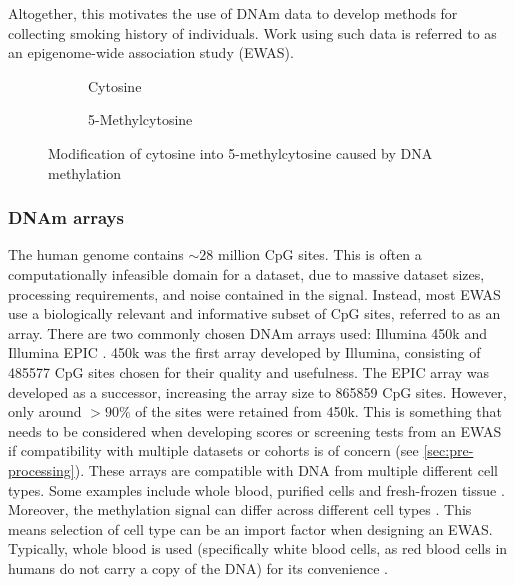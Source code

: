 \documentclass{article} %
\begin{document}
Altogether, this motivates the use of DNAm data to develop methods for collecting smoking history of individuals. Work using such data is referred to as an epigenome-wide association study (EWAS).

\begin{figure}
    \begin{subfigure}{0.49\textwidth}
        \centering
        \hspace*{11mm}
        \vspace{3mm}
        \caption{Cytosine}
    \end{subfigure}
    \begin{subfigure}{0.49\textwidth}
        \centering
        \vspace{3mm}
        \caption{5-Methylcytosine}
    \end{subfigure}
    \caption[Methylation of cytosine]{Modification of cytosine into 5-methylcytosine caused by DNA methylation}
    \label{fig:cytosine-methylation}
\end{figure}

\subsubsection{DNAm arrays}
The human genome contains \(\sim\!28\) million CpG sites. This is often a computationally infeasible domain for a dataset, due to massive dataset sizes, processing requirements, and noise contained in the signal. Instead, most EWAS use a biologically relevant and informative subset of CpG sites, referred to as an array. There are two commonly chosen DNAm arrays used: Illumina 450k \cite{illumina2012methylation450} and Illumina EPIC \cite{illumina2015methylationepic}. 450k was the first array developed by Illumina, consisting of \num{485577} CpG sites chosen for their quality and usefulness. The EPIC array was developed as a successor, increasing the array size to \num{865859} CpG sites. However, only around \(>90\%\) of the sites were retained from 450k. This is something that needs to be considered when developing scores or screening tests from an EWAS if compatibility with multiple datasets or cohorts is of concern (see \ref{sec:pre-processing}). These arrays are compatible with DNA from multiple different cell types. Some examples include whole blood, purified cells and fresh-frozen tissue \cite{bhat2022data}. Moreover, the methylation signal can differ across different cell types \cite{huang2016epigenome}. This means selection of cell type can be an import factor when designing an EWAS. Typically, whole blood is used (specifically white blood cells, as red blood cells in humans do not carry a copy of the DNA) for its convenience \cite{houseman2015dna}.
\end{document}
